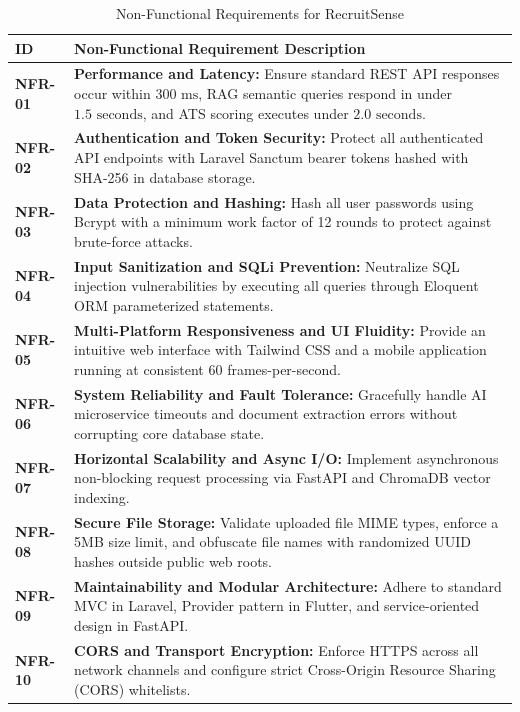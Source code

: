 \begin{table}[h!]
\centering
\small
\caption{Non-Functional Requirements for RecruitSense}
\label{tab:non_functional_reqs}
\begin{tabular}{|l|p{12cm}|}
\hline
\textbf{ID} & \textbf{Non-Functional Requirement Description} \\ \hline
\textbf{NFR-01} & \textbf{Performance and Latency:} Ensure standard REST API responses occur within $300\text{ ms}$, RAG semantic queries respond in under $1.5\text{ seconds}$, and ATS scoring executes under $2.0\text{ seconds}$. \\ \hline
\textbf{NFR-02} & \textbf{Authentication and Token Security:} Protect all authenticated API endpoints with Laravel Sanctum bearer tokens hashed with SHA-256 in database storage. \\ \hline
\textbf{NFR-03} & \textbf{Data Protection and Hashing:} Hash all user passwords using Bcrypt with a minimum work factor of 12 rounds to protect against brute-force attacks. \\ \hline
\textbf{NFR-04} & \textbf{Input Sanitization and SQLi Prevention:} Neutralize SQL injection vulnerabilities by executing all queries through Eloquent ORM parameterized statements. \\ \hline
\textbf{NFR-05} & \textbf{Multi-Platform Responsiveness and UI Fluidity:} Provide an intuitive web interface with Tailwind CSS and a mobile application running at consistent 60 frames-per-second. \\ \hline
\textbf{NFR-06} & \textbf{System Reliability and Fault Tolerance:} Gracefully handle AI microservice timeouts and document extraction errors without corrupting core database state. \\ \hline
\textbf{NFR-07} & \textbf{Horizontal Scalability and Async I/O:} Implement asynchronous non-blocking request processing via FastAPI and ChromaDB vector indexing. \\ \hline
\textbf{NFR-08} & \textbf{Secure File Storage:} Validate uploaded file MIME types, enforce a 5MB size limit, and obfuscate file names with randomized UUID hashes outside public web roots. \\ \hline
\textbf{NFR-09} & \textbf{Maintainability and Modular Architecture:} Adhere to standard MVC in Laravel, Provider pattern in Flutter, and service-oriented design in FastAPI. \\ \hline
\textbf{NFR-10} & \textbf{CORS and Transport Encryption:} Enforce HTTPS across all network channels and configure strict Cross-Origin Resource Sharing (CORS) whitelists. \\ \hline
\end{tabular}
\end{table}

